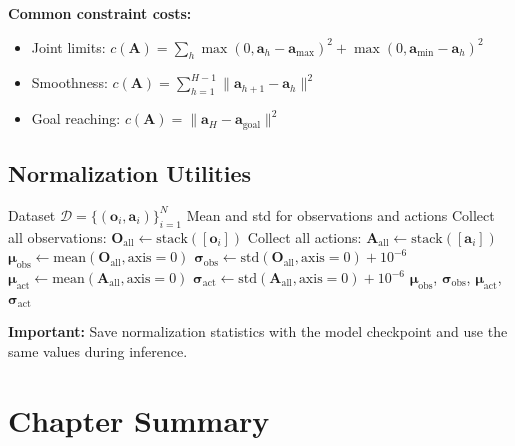 \textbf{Common constraint costs:}
\begin{itemize}
    \item Joint limits: $c(\mathbf{A}) = \sum_h \max(0, \mathbf{a}_h - \mathbf{a}_{\max})^2 + \max(0, \mathbf{a}_{\min} - \mathbf{a}_h)^2$
    \item Smoothness: $c(\mathbf{A}) = \sum_{h=1}^{H-1} \|\mathbf{a}_{h+1} - \mathbf{a}_h\|^2$
    \item Goal reaching: $c(\mathbf{A}) = \|\mathbf{a}_H - \mathbf{a}_{\text{goal}}\|^2$
\end{itemize}

\subsection{Normalization Utilities}
\label{subsec:normalization_utilities}

\begin{algorithm}[H]
\caption{Compute Normalization Statistics}
\label{alg:compute_normalization}
\begin{algorithmic}[1]
\REQUIRE Dataset $\mathcal{D} = \{(\mathbf{o}_i, \mathbf{a}_i)\}_{i=1}^N$
\ENSURE Mean and std for observations and actions
\STATE Collect all observations: $\mathbf{O}_{\text{all}} \gets \text{stack}([\mathbf{o}_i])$
\STATE Collect all actions: $\mathbf{A}_{\text{all}} \gets \text{stack}([\mathbf{a}_i])$
\STATE $\boldsymbol{\mu}_{\text{obs}} \gets \text{mean}(\mathbf{O}_{\text{all}}, \text{axis}=0)$
\STATE $\boldsymbol{\sigma}_{\text{obs}} \gets \text{std}(\mathbf{O}_{\text{all}}, \text{axis}=0) + 10^{-6}$ 
\STATE $\boldsymbol{\mu}_{\text{act}} \gets \text{mean}(\mathbf{A}_{\text{all}}, \text{axis}=0)$
\STATE $\boldsymbol{\sigma}_{\text{act}} \gets \text{std}(\mathbf{A}_{\text{all}}, \text{axis}=0) + 10^{-6}$
\RETURN $\boldsymbol{\mu}_{\text{obs}}$, $\boldsymbol{\sigma}_{\text{obs}}$, $\boldsymbol{\mu}_{\text{act}}$, $\boldsymbol{\sigma}_{\text{act}}$
\end{algorithmic}
\end{algorithm}

\textbf{Important:} Save normalization statistics with the model checkpoint and use the same values during inference.

\section{Chapter Summary}
\label{sec:chapter_summary}

